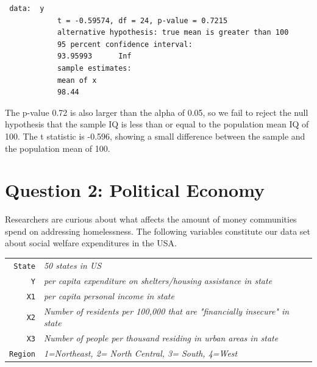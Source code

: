 \documentclass[12pt,letterpaper]{article}
\begin{document}
\begin{enumerate}
		\begin{verbatim} data:  y
			t = -0.59574, df = 24, p-value = 0.7215
			alternative hypothesis: true mean is greater than 100
			95 percent confidence interval:
			93.95993      Inf
			sample estimates:
			mean of x 
			98.44  \end{verbatim}

\end{enumerate}

\newpage
	
 \noindent The p-value 0.72 is also larger than the alpha of 0.05, so we fail to reject the null hypothesis that the sample IQ is less than or equal to the population mean IQ of 100. The t statistic is -0.596, showing a small difference between the sample and the population mean of 100. \\ 

	\section*{Question 2: Political Economy}

\noindent Researchers are curious about what affects the amount of money communities spend on addressing homelessness. The following variables constitute our data set about social welfare expenditures in the USA. \\
\vspace{.5cm}


\begin{tabular}{r|l}
	\texttt{State} &\emph{50 states in US} \\
	\texttt{Y} & \emph{per capita expenditure on shelters/housing assistance in state}\\
	\texttt{X1} &\emph{per capita personal income in state} \\
	\texttt{X2} &  \emph{Number of residents per 100,000 that are "financially insecure" in state}\\
	\texttt{X3} &  \emph{Number of people per thousand residing in urban areas in state} \\
	\texttt{Region} &  \emph{1=Northeast, 2= North Central, 3= South, 4=West} \\
\end{tabular}
\end{document}

